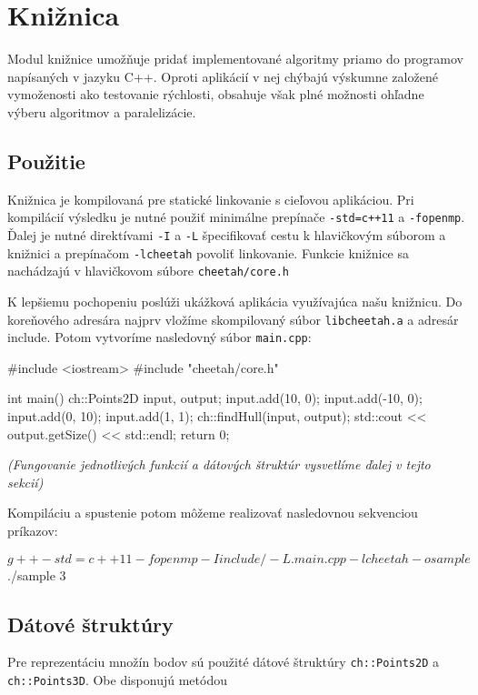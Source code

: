 \documentclass[a4paper, 12pt, slovak]{article}
\begin{document}
\section{Knižnica}
Modul knižnice umožňuje pridať implementované algoritmy priamo do programov 
napísaných v jazyku C++. Oproti aplikácií v nej chýbajú výskumne založené 
vymoženosti ako testovanie rýchlosti, obsahuje však plné možnosti ohľadne výberu 
algoritmov a paralelizácie.

\subsection{Použitie}
Knižnica je kompilovaná pre statické linkovanie s cieľovou aplikáciou. Pri 
kompilácií výsledku je nutné použiť minimálne prepínače \texttt{-std=c++11} a 
\texttt{-fopenmp}. Ďalej je nutné direktívami \texttt{-I} a \texttt{-L} špecifikovať 
cestu k hlavičkovým súborom a knižnici a prepínačom \texttt{-lcheetah} povoliť 
linkovanie. Funkcie knižnice sa nachádzajú v hlavičkovom súbore 
\texttt{cheetah/core.h}

K lepšiemu pochopeniu poslúži ukážková aplikácia využívajúca našu knižnicu. Do 
koreňového adresára najprv vložíme skompilovaný súbor \texttt{libcheetah.a} a 
adresár {include}. Potom vytvoríme nasledovný súbor \texttt{main.cpp}:

\begin{c++}
#include <iostream>
#include "cheetah/core.h"

int main() {
    ch::Points2D input, output;
    input.add({10, 0});
    input.add({-10, 0});
    input.add({0, 10});
    input.add({1, 1});
    ch::findHull(input, output);
    std::cout << output.getSize() << std::endl;
    return 0;
}
\end{c++}

\emph{(Fungovanie jednotlivých funkcií a dátových štruktúr vysvetlíme ďalej v tejto 
sekcií)}

Kompiláciu a spustenie potom môžeme realizovať nasledovnou sekvenciou príkazov:

\begin{c++}
$ g++ -std=c++11 -fopenmp -I include/ -L . main.cpp -lcheetah -o sample
$ ./sample 
3
\end{c++}

\subsection{Dátové štruktúry}
Pre reprezentáciu množín bodov sú použité dátové štruktúry \texttt{ch::Points2D} a 
\texttt{ch::Points3D}. Obe disponujú metódou
\end{document}
